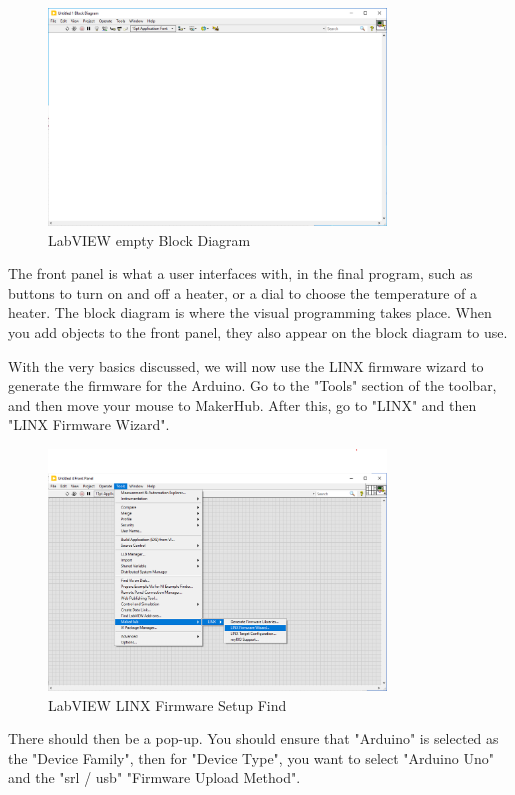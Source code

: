 \documentclass[a4paper,11pt]{report}
\begin{document}
\begin{figure}[H]
\centering
\includegraphics[width=0.8\textwidth]{screenshots/labview4}
\caption{LabVIEW empty Block Diagram}
\end{figure}

The front panel is what a user interfaces with, in the final program, such as buttons to turn on and off a heater, or a dial to choose the temperature of a heater. The block diagram is where the visual programming takes place. When you add objects to the front panel, they also appear on the block diagram to use.

With the very basics discussed, we will now use the LINX firmware wizard to generate the firmware for the Arduino. Go to the "Tools" section of the toolbar, and then move your mouse to MakerHub. After this, go to "LINX" and then "LINX Firmware Wizard".

\begin{figure}[H]
\centering
\includegraphics[width=0.8\textwidth]{screenshots/labviewarduino1}
\caption{LabVIEW LINX Firmware Setup Find}
\end{figure}

There should then be a pop-up. You should ensure that "Arduino" is selected as the "Device Family", then for "Device Type", you want to select "Arduino Uno" and the "\gls{srl} / \gls{usb}" "Firmware Upload Method".
\end{document}
